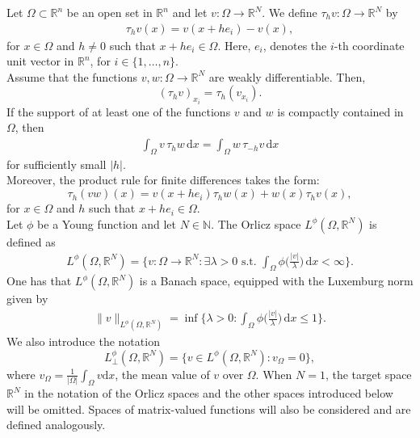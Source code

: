 \documentclass[leqno,11pt]{amsart}%
\numberwithin{equation}{section}
\def\Rn{{\mathbb R}^{n}}
\def\rn{\Rn}
\def\d{\mathrm{d}}
\def\dx{\d x}
\theoremstyle{definition}
\numberwithin{equation}{section}
\begin{document}
 

Let $\Omega \subset \rn$ be an open set in $\rn$ and  let $v: \Omega \to \mathbb R^N$. We define 
 $\tau_hv : \Omega \to \mathbb R^N$ by 
  \begin{equation}
    \begin{gathered}
      \tau_h v(x)= v(x+he_i)-v(x),
    \end{gathered}
\label{def:diff-quotients}
\end{equation}
for 
$x\in\Omega$ and
$h\neq0$ such that $x+he_i\in\Omega$. Here, 
$e_i$,   denotes the $i$-th coordinate unit vector in $\mathbb R^n$, for $i\in\{1,\dots,n\}$.
  \\ Assume that the functions $v, w : \Omega \to \mathbb R^N$ are weakly differentiable. Then,
$$ (\tau_{h}v)_{x_i}=\tau_{h}(v_{x_i}).$$
  If the support of at least one of the functions $v$ and
  $w$ is compactly contained in $\Omega$, then 
\begin{align}
    \label{july19}
    \int_{\Omega} v\, \tau_{h} w\, \dx =\int_{\Omega} w\, \tau_{-h}v\, \dx
\end{align}
for sufficiently small $|h|$.
\\ Moreover,
 the  product rule for  finite differences takes the form:
\begin{equation}\label{product-rule}
\tau_{h}(v w)(x)=v(x+he_i)\tau_{h}w(x)+w(x)\tau_{h}v(x),
\end{equation}
 for $x\in \Omega$ and $h$ such that $x+he_i \in \Omega$.
\\
Let $\phi$ be a Young function and let $N\in \mathbb N$. The  Orlicz space $L^\phi(\Omega, \mathbb R^N)$ is defined as 
\begin{align}
    \label{orlicz}
    L^\phi (\Omega, \mathbb R^N)= \bigg\{v: \Omega \to \mathbb R^N: \exists \lambda >0\,\,\text{s.t.} \,\, \int_\Omega\phi\bigg(\frac{|v|}{\lambda}\bigg)\, \d x <\infty\bigg\}.
\end{align}
{One has that $L^\phi(\Omega, \mathbb R^N)$  is a Banach space, equipped with the Luxemburg norm given by
\begin{align}
    \label{orlicznorm}
    \|v\|_{L^\phi(\Omega, \mathbb R^N)}= \inf\bigg\{\lambda >0: \int_\Omega\phi\bigg(\frac{|v|}{\lambda}\bigg)\, \d x \leq 1\bigg\}.
\end{align}}
We also introduce  the notation $$L^\phi_\perp (\Omega, \mathbb R^N)= \{ v\in L^\phi (\Omega, \mathbb R^N): v_\Omega =0\},$$ 
where $v_\Omega = \frac 1{|\Omega|}\int_\Omega v\d x$, the mean value of $v$ over $\Omega$.   When $N=1$, the target space $\mathbb R^N$ in the notation of the Orlicz spaces and the other spaces introduced below will be omitted. Spaces of matrix-valued functions will also be considered and are defined analogously.
\end{document}
